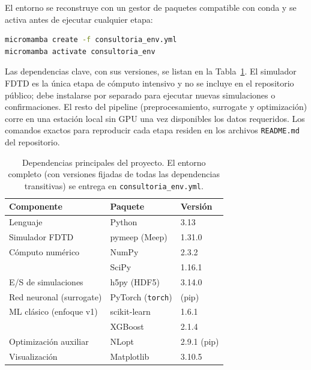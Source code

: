 El entorno se reconstruye con un gestor de paquetes compatible con conda y se activa antes de ejecutar cualquier etapa:

\begin{lstlisting}[language=bash, numbers=none, basicstyle=\ttfamily\scriptsize]
micromamba create -f consultoria_env.yml
micromamba activate consultoria_env
\end{lstlisting}

Las dependencias clave, con sus versiones, se listan en la Tabla~\ref{tab:anexo_deps}. El simulador FDTD es la única etapa de cómputo intensivo y no se incluye en el repositorio público; debe instalarse por separado para ejecutar nuevas simulaciones o confirmaciones. El resto del pipeline (preprocesamiento, surrogate y optimización) corre en una estación local sin GPU una vez disponibles los datos requeridos. Los comandos exactos para reproducir cada etapa residen en los archivos \texttt{README.md} del repositorio.

\begin{table}[H]
\centering
\small
\begin{tabular}{lll}
\toprule
\textbf{Componente} & \textbf{Paquete} & \textbf{Versión} \\
\midrule
Lenguaje              & Python              & 3.13 \\
Simulador FDTD        & pymeep (Meep)       & 1.31.0 \\
Cómputo numérico      & NumPy               & 2.3.2 \\
                      & SciPy               & 1.16.1 \\
E/S de simulaciones   & h5py (HDF5)         & 3.14.0 \\
Red neuronal (surrogate) & PyTorch (\texttt{torch}) & (pip) \\
ML clásico (enfoque v1)  & scikit-learn      & 1.6.1 \\
                      & XGBoost             & 2.1.4 \\
Optimización auxiliar & NLopt               & 2.9.1 (pip) \\
Visualización         & Matplotlib          & 3.10.5 \\
\bottomrule
\end{tabular}
\caption{Dependencias principales del proyecto. El entorno completo (con versiones fijadas de todas las dependencias transitivas) se entrega en \texttt{consultoria\_env.yml}.}
\label{tab:anexo_deps}
\end{table}

